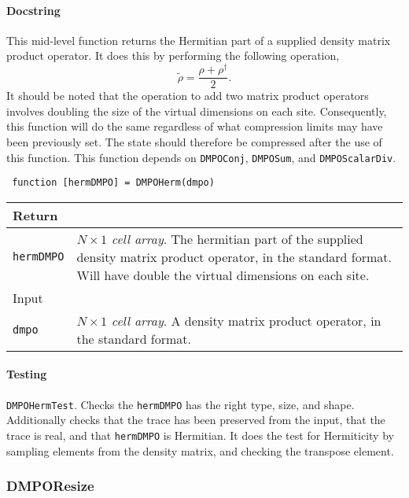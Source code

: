  \paragraph{Docstring} This mid-level function returns the Hermitian part of a supplied density matrix product operator. It does this by performing the following operation, 
 \begin{equation}
 \tilde{\rho} = \frac{\rho + \rho^{\dagger}}{2}.
 \label{eq:vs3-2}
 \end{equation}
 It should be noted that the operation to add two matrix product operators involves doubling the size of the virtual dimensions on each site. Consequently, this function will do the same regardless of what compression limits may have been previously set. The state should therefore be compressed after the use of this function. This function depends on \lstinline$DMPOConj$, \lstinline$DMPOSum$, and \lstinline$DMPOScalarDiv$.
 \begin{lstlisting}
 function [hermDMPO] = DMPOHerm(dmpo) \end{lstlisting}
 \begin{longtabu}{X[1,l]X[4,l]}
 \hline
 Return & \\ \hline
 \lstinline$hermDMPO$ & \emph{\(N \times 1\) cell array}. The hermitian part of the supplied density matrix product operator, in the standard format. Will have double the virtual dimensions on each site. \\ \hline
 Input & \\ \hline
 \lstinline$dmpo$ & \emph{\(N \times 1\) cell array}. A density matrix product operator, in the standard format. \\
 \hline
 \end{longtabu}
 \paragraph{Testing} \lstinline$DMPOHermTest$. Checks the \lstinline$hermDMPO$ has the right type, size, and shape. Additionally checks that the trace has been preserved from the input, that the trace is real, and that \lstinline$hermDMPO$ is Hermitian. It does the test for Hermiticity by sampling elements from the density matrix, and checking the transpose element.

 \subsubsection{DMPOResize}
